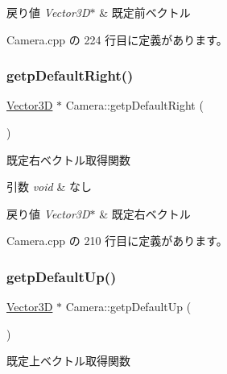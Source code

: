 \begin{DoxyRetVals}{戻り値}
{\em Vector3\+D$\ast$} & 既定前ベクトル \\
\hline
\end{DoxyRetVals}


 Camera.\+cpp の 224 行目に定義があります。

\mbox{\label{class_camera_ad83e4c1317708ca7282556d3f6a9ad25}} 
\subsubsection{\texorpdfstring{getp\+Default\+Right()}{getpDefaultRight()}}
{\footnotesize\ttfamily \mbox{\hyperlink{class_vector3_d}{Vector3D}} $\ast$ Camera\+::getp\+Default\+Right (\begin{DoxyParamCaption}{ }\end{DoxyParamCaption})}



既定右ベクトル取得関数 


\begin{DoxyParams}{引数}
{\em void} & なし \\
\hline
\end{DoxyParams}

\begin{DoxyRetVals}{戻り値}
{\em Vector3\+D$\ast$} & 既定右ベクトル \\
\hline
\end{DoxyRetVals}


 Camera.\+cpp の 210 行目に定義があります。

\mbox{\label{class_camera_a1a807dd20a5e8a5d8e5116748a54dfa7}} 
\subsubsection{\texorpdfstring{getp\+Default\+Up()}{getpDefaultUp()}}
{\footnotesize\ttfamily \mbox{\hyperlink{class_vector3_d}{Vector3D}} $\ast$ Camera\+::getp\+Default\+Up (\begin{DoxyParamCaption}{ }\end{DoxyParamCaption})}



既定上ベクトル取得関数 



